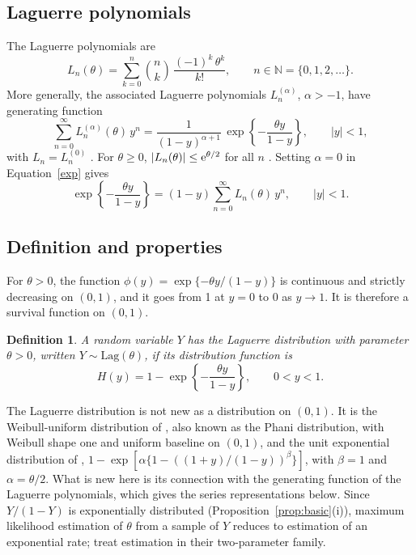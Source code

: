 \documentclass[12pt]{article}
\newcommand{\N}{\mathbb{N}}       %
\newcommand{\e}{{\rm e}}         %
\newcommand{\Lag}{\mathrm{Lag}}  %
\newtheorem{definition}{Definition}
\begin{document}
\subsection{Laguerre polynomials}

The Laguerre polynomials are
\begin{equation}\label{def-Lag}
L_n(\theta) = \sum_{k=0}^{n} \binom{n}{k}\, \frac{(-1)^k\,\theta^k}{k!}, \qquad n\in\N=\{0,1,2,\dots\}.
\end{equation}
More generally, the associated Laguerre polynomials $L_n^{(\alpha)}$, $\alpha>-1$, have generating function
\begin{equation}\label{exp}
\sum_{n=0}^{\infty} L_n^{(\alpha)}(\theta)\, y^n = \frac{1}{(1-y)^{\alpha+1}}\,\exp\left\{-\frac{\theta y}{1-y}\right\}, \qquad |y|<1,
\end{equation}
with $L_n=L_n^{(0)}$ \citep[see][]{lebedev1965special, rainville1960special}. For $\theta\geq 0$, $|L_n(\theta)|\leq \e^{\theta/2}$ for all $n$ \citep{szeg1939orthogonal}. Setting $\alpha=0$ in Equation~\eqref{exp} gives
\begin{equation}\label{family}
\exp\left\{-\frac{\theta y}{1-y}\right\}=(1-y)\sum^{\infty}_{n=0} L_{n}(\theta) \, y^n, \qquad |y|<1.
\end{equation}

\subsection{Definition and properties}

For $\theta>0$, the function $\phi(y)=\exp\{-\theta y/(1-y)\}$ is continuous and strictly decreasing on $(0,1)$, and it goes from 1 at $y=0$ to 0 as $y\to1$. It is therefore a survival function on $(0,1)$.

\begin{definition}
A random variable $Y$ has the Laguerre distribution with parameter $\theta>0$, written $Y\sim\Lag(\theta)$, if its distribution function is
\[
H(y)=1-\exp\left\{-\frac{\theta y}{1-y}\right\}, \qquad 0<y<1.
\]
\end{definition}

The Laguerre distribution is not new as a distribution on $(0,1)$. It is the Weibull-uniform distribution of \citet[Section~3.1]{bourguignon2014weibull}, also known as the Phani distribution, with Weibull shape one and uniform baseline on $(0,1)$, and the unit exponential distribution of \citet{bakouch2023unit}, $1-\exp[\alpha\{1-((1+y)/(1-y))^\beta\}]$, with $\beta=1$ and $\alpha=\theta/2$. What is new here is its connection with the generating function of the Laguerre polynomials, which gives the series representations below. Since $Y/(1-Y)$ is exponentially distributed (Proposition~\ref{prop:basic}(i)), maximum likelihood estimation of $\theta$ from a sample of $Y$ reduces to estimation of an exponential rate; \citet{bakouch2023unit} treat estimation in their two-parameter family.
\end{document}
